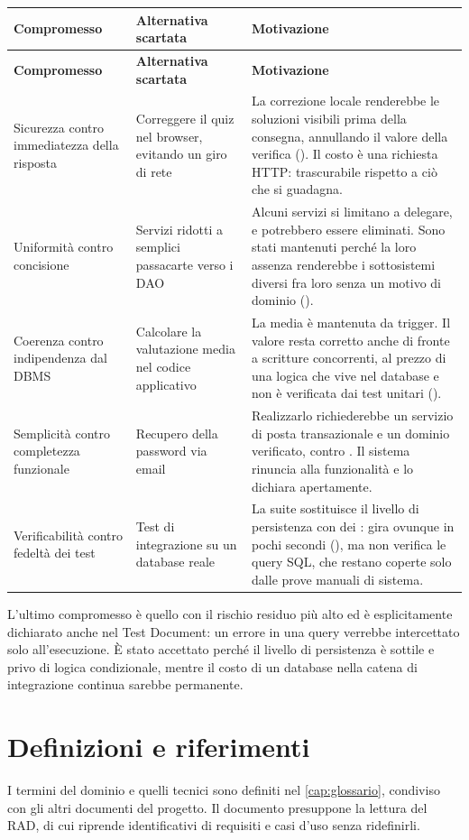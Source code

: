 \begin{longtable}{@{}L{3.6cm} L{4.2cm} L{6.4cm}@{}}
\toprule
\textbf{Compromesso} & \textbf{Alternativa scartata} & \textbf{Motivazione} \\
\midrule
\endfirsthead
\toprule
\textbf{Compromesso} & \textbf{Alternativa scartata} & \textbf{Motivazione} \\
\midrule
\endhead
\bottomrule
\endlastfoot

Sicurezza contro immediatezza della risposta &
Correggere il quiz nel browser, evitando un giro di rete &
La correzione locale renderebbe le soluzioni visibili prima della consegna,
annullando il valore della verifica (). Il costo è una richiesta
HTTP: trascurabile rispetto a ciò che si guadagna. \\

Uniformità contro concisione &
Servizi ridotti a semplici passacarte verso i DAO &
Alcuni servizi si limitano a delegare, e potrebbero essere eliminati. Sono
stati mantenuti perché la loro assenza renderebbe i sottosistemi diversi fra
loro senza un motivo di dominio (). \\

Coerenza contro indipendenza dal DBMS &
Calcolare la valutazione media nel codice applicativo &
La media è mantenuta da trigger. Il valore resta corretto anche di fronte a
scritture concorrenti, al prezzo di una logica che vive nel database e non è
verificata dai test unitari (). \\

Semplicità contro completezza funzionale &
Recupero della password via email &
Realizzarlo richiederebbe un servizio di posta transazionale e un dominio
verificato, contro . Il sistema rinuncia alla funzionalità e lo
dichiara apertamente. \\

Verificabilità contro fedeltà dei test &
Test di integrazione su un database reale &
La suite sostituisce il livello di persistenza con dei : gira ovunque in
pochi secondi (), ma non verifica le query SQL, che restano coperte
solo dalle prove manuali di sistema. \\

\end{longtable}

\begin{nota}
L'ultimo compromesso è quello con il rischio residuo più alto ed è
esplicitamente dichiarato anche nel Test Document: un errore in una query
verrebbe intercettato solo all'esecuzione. È stato accettato perché il
livello di persistenza è sottile e privo di logica condizionale, mentre il
costo di un database nella catena di integrazione continua sarebbe permanente.
\end{nota}

\section{Definizioni e riferimenti}

I termini del dominio e quelli tecnici sono definiti nel
\cref{cap:glossario}, condiviso con gli altri documenti del progetto. Il
documento presuppone la lettura del RAD, di cui riprende identificativi di
requisiti e casi d'uso senza ridefinirli.
